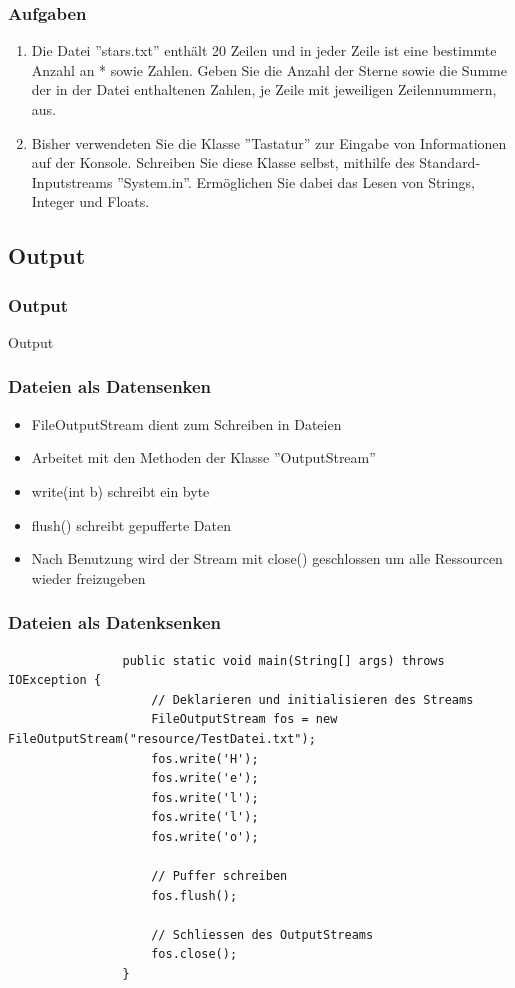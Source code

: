 \begin{frame}
	\frametitle{Aufgaben}
	\begin{enumerate}
	  \item Die Datei ''stars.txt'' enthält 20 Zeilen und in jeder Zeile ist eine
	  bestimmte Anzahl an * sowie Zahlen. Geben Sie die Anzahl der Sterne sowie die
	  Summe der in der Datei enthaltenen Zahlen, je Zeile mit jeweiligen
	  Zeilennummern, aus.
	  \item Bisher verwendeten Sie die Klasse ''Tastatur'' zur Eingabe von
	  Informationen auf der Konsole. Schreiben Sie diese Klasse selbst, mithilfe
	  des Standard-Inputstreams ''System.in''. Ermöglichen Sie dabei das Lesen von
	  Strings, Integer und Floats.
	\end{enumerate}
\end{frame}


\subsection{Output}
\begin{frame}[fragile]
	\frametitle{Output}
	\huge Output
\end{frame}

\begin{frame}[fragile]
\frametitle{Dateien als Datensenken}
	\begin{itemize}
	  \item FileOutputStream dient zum Schreiben in Dateien
	  \item Arbeitet mit den Methoden der Klasse ''OutputStream''
	  \item write(int b) schreibt ein byte
	  \item flush() schreibt gepufferte Daten
	  \item Nach Benutzung wird der Stream mit close() geschlossen um alle
	  Ressourcen wieder freizugeben
	\end{itemize}
\end{frame}

\begin{frame}[fragile]
\frametitle{Dateien als Datenksenken}
		\begin{lstlisting}
				public static void main(String[] args) throws IOException {
					// Deklarieren und initialisieren des Streams
					FileOutputStream fos = new FileOutputStream("resource/TestDatei.txt");
					fos.write('H');
					fos.write('e');
					fos.write('l');
					fos.write('l');
					fos.write('o');
			
					// Puffer schreiben
					fos.flush();
			
					// Schliessen des OutputStreams
					fos.close();
				}
		\end{lstlisting}
\end{frame}

